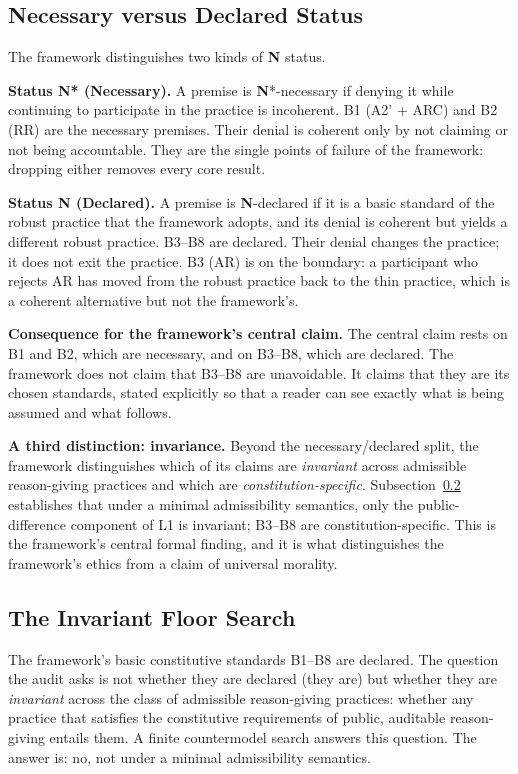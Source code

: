 \documentclass[11pt]{article}
\def\ensuremath#1{#1}%
\def\mathrm#1{#1}%
\def\textsuperscript#1{#1}%
\newcommand{\statusN}{\textcolor{stN}{\textbf{N}}}
\newcommand{\Atwo}{\texorpdfstring{\ensuremath{\mathrm{A2}'}}{A2'}}
\begin{document}
\subsection{Necessary versus Declared Status}
The framework distinguishes two kinds of \statusN{} status.
\begin{paperbox}
\textbf{Status \statusN{}\textsuperscript{*} (Necessary).} A premise is \statusN{}\textsuperscript{*}-necessary if denying it while continuing to participate in the practice is incoherent. B1 (\Atwo{} + ARC) and B2 (RR) are the necessary premises. Their denial is coherent only by not claiming or not being accountable. They are the single points of failure of the framework: dropping either removes every core result.

\textbf{Status \statusN{} (Declared).} A premise is \statusN{}-declared if it is a basic standard of the robust practice that the framework adopts, and its denial is coherent but yields a different robust practice. B3--B8 are declared. Their denial changes the practice; it does not exit the practice. B3 (AR) is on the boundary: a participant who rejects AR has moved from the robust practice back to the thin practice, which is a coherent alternative but not the framework's.
\end{paperbox}

\textbf{Consequence for the framework's central claim.} The central claim rests on B1 and B2, which are necessary, and on B3--B8, which are declared. The framework does not claim that B3--B8 are unavoidable. It claims that they are its chosen standards, stated explicitly so that a reader can see exactly what is being assumed and what follows.

\textbf{A third distinction: invariance.} Beyond the necessary/declared split, the framework distinguishes which of its claims are \emph{invariant} across admissible reason-giving practices and which are \emph{constitution-specific}. Subsection~\ref{sec:adm0} establishes that under a minimal admissibility semantics, only the public-difference component of L1 is invariant; B3--B8 are constitution-specific. This is the framework's central formal finding, and it is what distinguishes the framework's ethics from a claim of universal morality.

\subsection{The Invariant Floor Search}\label{sec:adm0}
The framework's basic constitutive standards B1--B8 are declared. The question the audit asks is not whether they are declared (they are) but whether they are \emph{invariant} across the class of admissible reason-giving practices: whether any practice that satisfies the constitutive requirements of public, auditable reason-giving entails them. A finite countermodel search answers this question. The answer is: no, not under a minimal admissibility semantics.
\end{document}
